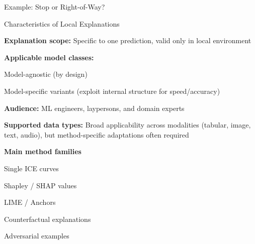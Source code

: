 \documentclass[10pt,compress,t,notes=noshow, xcolor=table]{beamer}
\begin{document}
\begin{framev}[align=top]{Example: Stop or Right-of-Way?}
%
\end{framev}


\begin{framei}[align=top]{Characteristics of Local Explanations}
\item<1-> \textbf{Explanation scope:} Specific to one prediction, valid only in local environment
\item<2-> \textbf{Applicable model classes:}
\begin{itemizeS}
\item Model-agnostic (by design)
\item Model-specific variants (exploit internal structure for speed/accuracy)
\end{itemizeS}
\item<3-> \textbf{Audience:} ML engineers, laypersons, and domain experts
\item<4-> \textbf{Supported data types:} Broad applicability across modalities (tabular, image, text, audio), but method-specific adaptations often required
\item<5-> \textbf{Main method families}
\begin{itemizeS}
\item Single ICE curves
\item Shapley / SHAP values
\item LIME / Anchors
\item Counterfactual explanations
\item Adversarial examples
\end{itemizeS}
\end{framei}
\end{document}
